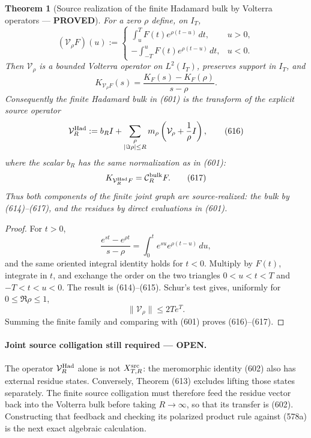 \documentclass[11pt]{article}
\newtheorem{theorem}{Theorem}
\newcommand{\PROVED}{\textcolor{green!45!black}{\textbf{PROVED}}}
\newcommand{\OPEN}{\textcolor{red!70!black}{\textbf{OPEN}}}
\begin{document}
\begin{theorem}[Source realization of the finite Hadamard bulk by Volterra
operators --- \PROVED]
For a zero \(\rho\) define, on \(I_T\),
\begin{equation}
 (\mathcal V_\rho F)(u):=
 \begin{cases}
 \displaystyle\int_u^T F(t)e^{\rho(t-u)}\,dt,&u>0,\\[2mm]
 \displaystyle-\int_{-T}^uF(t)e^{\rho(t-u)}\,dt,&u<0.
 \end{cases}                                         \tag{614}
\end{equation}
Then \(\mathcal V_\rho\) is a bounded Volterra operator on \(L^2(I_T)\),
preserves support in \(I_T\), and
\begin{equation}
 K_{\mathcal V_\rho F}(s)
 =\frac{K_F(s)-K_F(\rho)}{s-\rho}.                   \tag{615}
\end{equation}
Consequently the finite Hadamard bulk in (601) is the transform of the
explicit source operator
\begin{equation}
 \mathcal V_R^{\rm Had}
 :=b_RI+
 \sum_{\substack{\rho\\|\Im\rho|\le R}}m_\rho
 \left(\mathcal V_\rho+\frac1{\rho}I\right),          \tag{616}
\end{equation}
where the scalar \(b_R\) has the same normalization as in (601):
\begin{equation}
 K_{\mathcal V_R^{\rm Had}F}
 =\mathcal C_R^{\rm bulk}F.                          \tag{617}
\end{equation}
Thus both components of the finite joint graph are source-realized:
the bulk by (614)--(617), and the residues by direct evaluations in (601).
\end{theorem}

\begin{proof}
For \(t>0\),
\[
 \frac{e^{st}-e^{\rho t}}{s-\rho}
 =\int_0^te^{su}e^{\rho(t-u)}\,du,
\]
and the same oriented integral identity holds for \(t<0\).  Multiply by
\(F(t)\), integrate in \(t\), and exchange the order on the two triangles
\(0<u<t<T\) and \(-T<t<u<0\).  The result is (614)--(615).
Schur's test gives, uniformly for \(0\le\Re\rho\le1\),
\[
 \|\mathcal V_\rho\|\le 2Te^T.
\]
Summing the finite family and comparing with (601) proves
(616)--(617).
\end{proof}

\paragraph{Joint source colligation still required --- \OPEN.}
The operator \(\mathcal V_R^{\rm Had}\) alone is not
\(X_{T,R}^{\rm src}\): the meromorphic identity (602) also has external
residue states.  Conversely, Theorem (613) excludes lifting those states
separately.  The finite source colligation must therefore feed the residue
vector back into the Volterra bulk before taking \(R\to\infty\), so that
its transfer is (602).  Constructing that feedback and checking its
polarized product rule against (578a) is the next exact algebraic
calculation.
\end{document}
